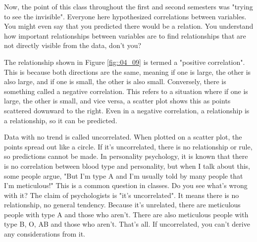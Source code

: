 \documentclass{ltjbook}
\begin{document}
Now, the point of this class throughout the first and second semesters was "trying to see the invisible". Everyone here hypothesized correlations between variables. You might even say that you predicted there would be a relation. You understand how important relationships between variables are to find relationships that are not directly visible from the data, don't you?

The relationship shown in Figure \ref{fig::04_09} is termed a "positive correlation". This is because both directions are the same, meaning if one is large, the other is also large, and if one is small, the other is also small. Conversely, there is something called a negative correlation. This refers to a situation where if one is large, the other is small, and vice versa, a scatter plot shows this as points scattered downward to the right. Even in a negative correlation, a relationship is a relationship, so it can be predicted.

Data with no trend is called uncorrelated. When plotted on a scatter plot, the points spread out like a circle. If it's uncorrelated, there is no relationship or rule, so predictions cannot be made. In personality psychology, it is known that there is no correlation between blood type and personality, but when I talk about this, some people argue, "But I'm type A and I'm usually told by many people that I'm meticulous!" This is a common question in classes. Do you see what's wrong with it? The claim of psychologists is "it's uncorrelated". It means there is no relationship, no general tendency. Because it's unrelated, there are meticulous people with type A and those who aren't. There are also meticulous people with type B, O, AB and those who aren't. That's all. If uncorrelated, you can't derive any considerations from it.
\end{document}
